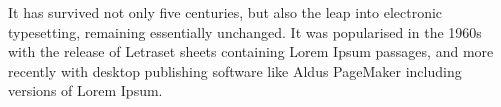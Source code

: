 
It has survived not only five centuries, but also the leap into
electronic typesetting, remaining essentially unchanged. It was
popularised in the 1960s with the release of Letraset sheets
containing Lorem Ipsum passages, and more recently with desktop
publishing software like Aldus PageMaker including versions of
Lorem Ipsum.
